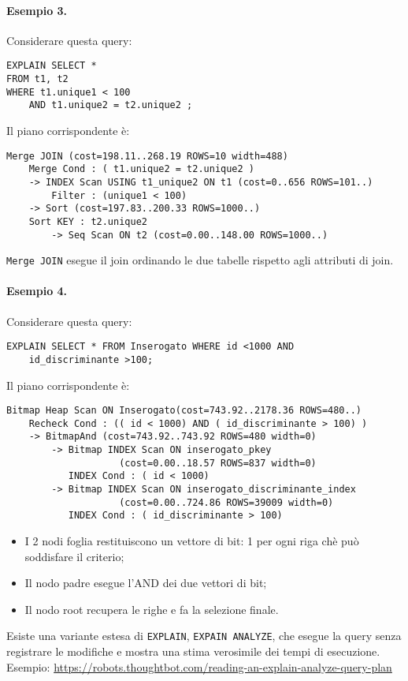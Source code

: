 \documentclass[a4paper, 10pt, titlepage]{article}
\begin{document}
	\paragraph{Esempio 3.}
		Considerare questa query:
	\begin{lstlisting}
EXPLAIN SELECT *
FROM t1, t2
WHERE t1.unique1 < 100 
	AND t1.unique2 = t2.unique2 ;
	\end{lstlisting}
	Il piano corrispondente è:
	\begin{lstlisting}
Merge JOIN (cost=198.11..268.19 ROWS=10 width=488)
	Merge Cond : ( t1.unique2 = t2.unique2 )
	-> INDEX Scan USING t1_unique2 ON t1 (cost=0..656 ROWS=101..)
		Filter : (unique1 < 100)
	-> Sort (cost=197.83..200.33 ROWS=1000..)
	Sort KEY : t2.unique2
		-> Seq Scan ON t2 (cost=0.00..148.00 ROWS=1000..)
	\end{lstlisting}
\lstinline|Merge JOIN| esegue il join ordinando le due tabelle rispetto agli attributi di join. \medskip

\paragraph{Esempio 4.}
		Considerare questa query:
	\begin{lstlisting}
EXPLAIN SELECT * FROM Inserogato WHERE id <1000 AND
	id_discriminante >100;
	\end{lstlisting}
	Il piano corrispondente è:
	\begin{lstlisting}
Bitmap Heap Scan ON Inserogato(cost=743.92..2178.36 ROWS=480..)
	Recheck Cond : (( id < 1000) AND ( id_discriminante > 100) )
	-> BitmapAnd (cost=743.92..743.92 ROWS=480 width=0)
		-> Bitmap INDEX Scan ON inserogato_pkey
					(cost=0.00..18.57 ROWS=837 width=0)
		   INDEX Cond : ( id < 1000)
		-> Bitmap INDEX Scan ON inserogato_discriminante_index
					(cost=0.00..724.86 ROWS=39009 width=0)
		   INDEX Cond : ( id_discriminante > 100)
	\end{lstlisting}
	\begin{itemize}
	\item I 2 nodi foglia restituiscono un vettore di bit: 1 per ogni riga chè può soddisfare il criterio;
	\item Il nodo padre esegue l'AND dei due vettori di bit;
	\item Il nodo root recupera le righe e fa la selezione finale.
	\end{itemize}  \medskip
	Esiste una variante estesa di \lstinline|EXPLAIN|, \lstinline|EXPAIN ANALYZE|, che esegue la query senza registrare le modifiche e mostra una stima verosimile dei tempi di esecuzione.\\
	Esempio:
	\url{https://robots.thoughtbot.com/reading-an-explain-analyze-query-plan}
\end{document}
